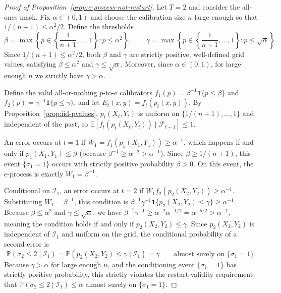 \documentclass{uai2026} %
\newcommand{\1}{\mathbf{1}}
\newcommand{\ind}[1]{\mathbf{1}\{#1\}}
\newcommand{\prob}{\mathbb{P}}
\newcommand{\expec}{\mathbb{E}}
\begin{document}
\begin{proof}[Proof of Proposition~\ref{prop:e-process-not-restart}]
  Let $T=2$ and consider the all-ones mask.
  Fix $\alpha \in (0, 1)$ and choose the calibration size $n$ large enough so that $1/(n+1) \le \alpha^2 / 2$.
  Define the thresholds
  \begin{equation*}
    \beta = \max\left\{p \in \left\{\frac{1}{n+1}, \dots, 1\right\} : p \le \alpha^2\right\},
    \qquad
    \gamma = \max\left\{p \in \left\{\frac{1}{n+1}, \dots, 1\right\} : p \le \sqrt{\alpha}\right\}.
  \end{equation*}
  Since $1/(n+1) \le \alpha^2/2$, both $\beta$ and $\gamma$ are strictly positive, well-defined grid values, satisfying $\beta \le \alpha^2$ and $\gamma \le \sqrt{\alpha}$.
  Moreover, since $\alpha \in (0,1)$, for large enough $n$ we strictly have $\gamma > \alpha$.

  Define the valid all-or-nothing $p$-to-$e$ calibrators $f_1(p) = \beta^{-1}\ind{p \le \beta}$ and $f_2(p) = \gamma^{-1}\ind{p \le \gamma}$, and let $E_t(x, y) = f_t(p_t(x, y))$.
  By Proposition~\ref{prop:iid-pvalues}, $p_t(X_t, Y_t)$ is uniform on $\{1/(n+1), \dots, 1\}$ and independent of the past, so $\expec[f_t(p_t(X_t, Y_t)) \mid \mathcal{F}_{t-1}] \leq 1$.

  An error occurs at $t=1$ if $W_1 = f_1(p_1(X_1, Y_1)) \ge \alpha^{-1}$, which happens if and only if $p_1(X_1, Y_1) \le \beta$ (because $\beta^{-1} \ge \alpha^{-2} > \alpha^{-1}$).
  Since $\beta \ge 1/(n+1)$, this event $\{\sigma_1 = 1\}$ occurs with strictly positive probability $\beta > 0$.
  On this event, the e-process is exactly $W_1 = \beta^{-1}$.

  Conditional on $\mathcal{I}_1$, an error occurs at $t=2$ if $W_1 f_2(p_2(X_2, Y_2)) \ge \alpha^{-1}$.
  Substituting $W_1 = \beta^{-1}$, this condition is $\beta^{-1} \gamma^{-1} \ind{p_2(X_2, Y_2) \le \gamma} \ge \alpha^{-1}$.
  Because $\beta \le \alpha^2$ and $\gamma \le \sqrt{\alpha}$, we have $\beta^{-1} \gamma^{-1} \ge \alpha^{-2} \alpha^{-1/2} = \alpha^{-5/2} > \alpha^{-1}$, meaning the condition holds if and only if $p_2(X_2, Y_2) \le \gamma$.
  Since $p_2(X_2, Y_2)$ is independent of $\mathcal{I}_1$ and uniform on the grid, the conditional probability of a second error is
  \begin{equation*}
    \prob(\sigma_2 \le 2 \mid \mathcal{I}_1) = \prob(p_2(X_2, Y_2) \le \gamma \mid \mathcal{I}_1) = \gamma
    \qquad \text{almost surely on } \{\sigma_1 = 1\}.
  \end{equation*}
  Because $\gamma > \alpha$ for large enough $n$, and the conditioning event $\{\sigma_1 = 1\}$ has strictly positive probability, this strictly violates the restart-validity requirement that $\prob(\sigma_2 \le 2 \mid \mathcal{I}_1) \le \alpha$ almost surely on $\{\sigma_1 = 1\}$.
\end{proof}\par\medskip
\end{document}
